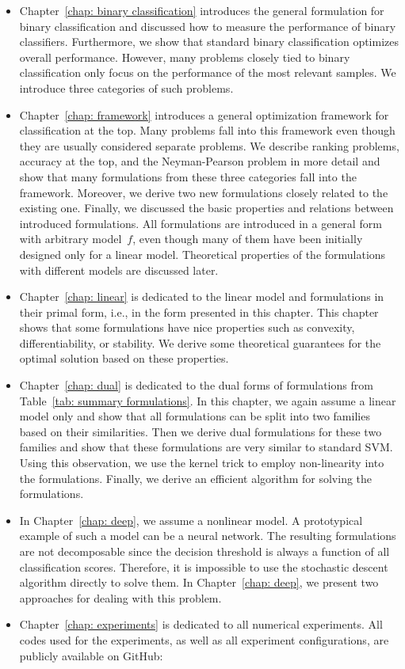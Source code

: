 \begin{itemize}
  \item Chapter~\ref{chap: binary classification} introduces the general formulation for binary classification and discussed how to measure the performance of binary classifiers. Furthermore, we show that standard binary classification optimizes overall performance. However, many problems closely tied to binary classification only focus on the performance of the most relevant samples. We introduce three categories of such problems.
  \item Chapter~\ref{chap: framework} introduces a general optimization framework for classification at the top. Many problems fall into this framework even though they are usually considered separate problems. We describe ranking problems, accuracy at the top, and the Neyman-Pearson problem in more detail and show that many formulations from these three categories fall into the framework. Moreover, we derive two new formulations closely related to the existing one. Finally, we discussed the basic properties and relations between introduced formulations. All formulations are introduced in a general form with arbitrary model~$f$, even though many of them have been initially designed only for a linear model. Theoretical properties of the formulations with different models are discussed later.
  \item Chapter~\ref{chap: linear} is dedicated to the linear model and formulations in their primal form, i.e., in the form presented in this chapter. This chapter shows that some formulations have nice properties such as convexity, differentiability, or stability. We derive some theoretical guarantees for the optimal solution based on these properties.
  \item Chapter~\ref{chap: dual} is dedicated to the dual forms of formulations from Table~\ref{tab: summary formulations}. In this chapter, we again assume a linear model only and show that all formulations can be split into two families based on their similarities. Then we derive dual formulations for these two families and show that these formulations are very similar to standard SVM. Using this observation, we use the kernel trick to employ non-linearity into the formulations. Finally, we derive an efficient algorithm for solving the formulations.
  \item In Chapter~\ref{chap: deep}, we assume a nonlinear model. A prototypical example of such a model can be a neural network. The resulting formulations are not decomposable since the decision threshold is always a function of all classification scores. Therefore, it is impossible to use the stochastic descent algorithm directly to solve them. In Chapter~\ref{chap: deep}, we present two approaches for dealing with this problem.
  \item Chapter~\ref{chap: experiments} is dedicated to all numerical experiments. All codes used for the experiments, as well as all experiment configurations, are publicly available on GitHub: \github
\end{itemize}
